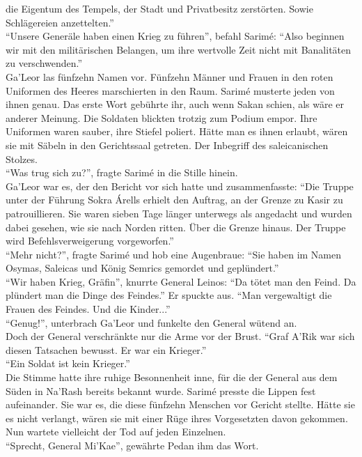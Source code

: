 die Eigentum des Tempels, der Stadt und Privatbesitz zerstörten. Sowie Schlägereien anzettelten.''\\
``Unsere Generäle haben einen Krieg zu führen'', befahl Sarimé: ``Also beginnen wir mit den 
militärischen Belangen, um ihre wertvolle Zeit nicht mit Banalitäten zu verschwenden.''\\
Ga'Leor las fünfzehn Namen vor. Fünfzehn Männer und Frauen in den roten Uniformen des Heeres 
marschierten in den Raum. Sarimé musterte jeden von ihnen genau. Das erste Wort gebührte ihr, auch 
wenn Sakan schien, als wäre er anderer Meinung. Die Soldaten blickten trotzig zum Podium empor. 
Ihre Uniformen waren sauber, ihre Stiefel poliert. Hätte man es ihnen erlaubt, wären sie mit 
Säbeln in den Gerichtssaal getreten. Der Inbegriff des saleicanischen Stolzes.\\
``Was trug sich zu?'', fragte Sarimé in die Stille hinein.\\
Ga'Leor war es, der den Bericht vor sich hatte und zusammenfasste: ``Die Truppe unter der Führung 
Sokra Árells erhielt den Auftrag, an der Grenze zu Kasir zu patrouillieren. Sie waren sieben Tage 
länger unterwegs als angedacht und wurden dabei gesehen, wie sie nach Norden ritten. Über die 
Grenze hinaus. Der Truppe wird Befehlsverweigerung vorgeworfen.''\\
``Mehr nicht?'', fragte Sarimé und hob eine Augenbraue: ``Sie haben im Namen Osymas, Saleicas und 
König Semrics gemordet und geplündert.''\\
``Wir haben Krieg, Gräfin'', knurrte General Leinos: ``Da tötet man den Feind. Da plündert man 
die Dinge des Feindes.'' Er spuckte aus. ``Man vergewaltigt die Frauen des Feindes. Und die 
Kinder...''\\
``Genug!'', unterbrach Ga'Leor und funkelte den General wütend an.\\
Doch der General verschränkte nur die Arme vor der Brust. ``Graf A'Rik war sich diesen Tatsachen 
bewusst. Er war ein Krieger.''\\
``Ein Soldat ist kein Krieger.''\\
Die Stimme hatte ihre ruhige Besonnenheit inne, für die der General aus dem Süden in Na'Rash 
bereits bekannt wurde. Sarimé presste die Lippen fest aufeinander. Sie war es, die diese fünfzehn 
Menschen vor Gericht stellte. Hätte sie es nicht verlangt, wären sie mit einer Rüge ihres 
Vorgesetzten davon gekommen. Nun wartete vielleicht der Tod auf jeden Einzelnen.\\
``Sprecht, General Mi'Kae'', gewährte Pedan ihm das Wort.\\
